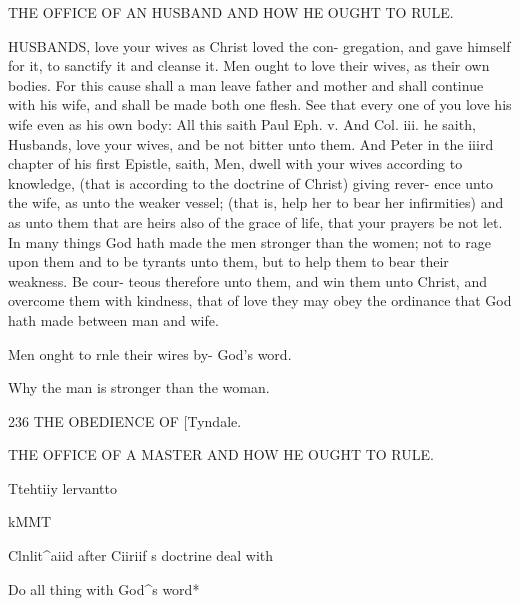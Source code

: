 \documentclass{custom}
\begin{document}
{THE OFFICE OF AN HUSBAND AND HOW HE 
OUGHT TO RULE. 

HUSBANDS, love your wives as Christ loved the con- 
gregation, and gave himself for it, to sanctify it and 
cleanse it. Men ought to love their wives, as their own 
bodies. For this cause shall a man leave father and mother 
and shall continue with his wife, and shall be made both 
one flesh. See that every one of you love his wife even as 
his own body: All this saith Paul Eph. v. And Col. iii. 
he saith, Husbands, love your wives, and be not bitter unto 
them. And Peter in the iiird chapter of his first Epistle, 
saith, Men, dwell with your wives according to knowledge, 
(that is according to the doctrine of Christ) giving rever- 
ence unto the wife, as unto the weaker vessel; (that is, 
help her to bear her infirmities) and as unto them that are 
heirs also of the grace of life, that your prayers be not let. 
In many things God hath made the men stronger than the 
women; not to rage upon them and to be tyrants unto them, 
but to help them to bear their weakness. Be cour- 
teous therefore unto them, and win them unto Christ, and 
overcome them with kindness, that of love they may obey 
the ordinance that God hath made between man and wife. 

Men onght 
to rnle their 
wires by- 
God's word. 

Why the 
man is 
stronger 
than the 
woman. 


236 
THE OBEDIENCE OF 
[Tyndale. 

THE OFFICE OF A MASTER AND HOW HE 
OUGHT TO RULE.

Ttehtiiy 
lervantto 

kMMT 

Clnlit^aiid 
after 
Ciiriif s 
doctrine 
deal with 

Do all 
thing with 
God^s 
word* 

}
\end{document}
